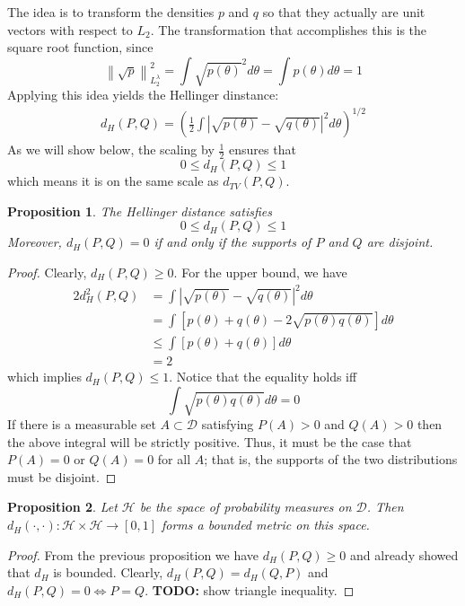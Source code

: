 \documentclass[12pt]{article}
\newcommand*{\norm}[1]{\left\lVert#1\right\rVert}
\newcommand*{\abs}[1]{\left\lvert#1\right\rvert}
\newtheorem{prop}{Proposition}
\begin{document}
The idea is to transform the densities $p$ and $q$ so that they actually are unit vectors with respect to $L_2$. The transformation that accomplishes this is the square root function, since 
\[\norm{\sqrt{p}}^2_{L_2^\lambda} = \int \sqrt{p(\theta)}^2 d\theta =  \int p(\theta) d\theta = 1 \]
Applying this idea yields the Hellinger dinstance:
\begin{align}
d_H(P, Q) = \left(\frac{1}{2} \int \abs{\sqrt{p(\theta)} - \sqrt{q(\theta)}}^2 d\theta \right)^{1/2} 
\end{align} 
As we will show below, the scaling by $\frac{1}{2}$ ensures that 
\[0 \leq d_H(P, Q) \leq 1\]
which means it is on the same scale as $d_{TV}(P, Q)$. 

\begin{prop}
The Hellinger distance satisfies 
\[0 \leq d_H(P, Q) \leq 1\]
Moreover,  $d_H(P, Q) = 0$ if and only if the supports of $P$ and $Q$ are disjoint.  
\end{prop}

\begin{proof}
Clearly, $d_H(P, Q) \geq 0$. For the upper bound, we have 
\begin{align*}
2d^2_H(P, Q) &= \int \abs{\sqrt{p(\theta)} - \sqrt{q(\theta)}}^2 d\theta \\
		      &= \int \left[ p(\theta) + q(\theta) - 2\sqrt{p(\theta) q(\theta)} \right] d\theta \\
		      &\leq \int \left[ p(\theta) + q(\theta) \right] d\theta \\
		      &= 2
\end{align*} 
which implies $d_H(P, Q) \leq 1$. Notice that the equality holds iff
\[\int \sqrt{p(\theta) q(\theta)} d\theta = 0\]
If there is a measurable set $A \subset \mathcal{D}$ satisfying $P(A) > 0$ and $Q(A) > 0$ then the above integral will be strictly positive. 
Thus, it must be the case that $P(A) = 0$ or $Q(A) = 0$ for all $A$; that is, the supports of the two distributions must be disjoint. 
\end{proof}

\begin{prop} 
Let $\mathcal{H}$ be the space of probability measures on $\mathcal{D}$. Then $d_H(\cdot, \cdot): \mathcal{H} \times \mathcal{H} \to [0, 1]$ forms a bounded metric on this space. 
\end{prop}

\begin{proof}
From the previous proposition we have $d_H(P, Q) \geq 0$ and already showed that $d_H$ is bounded. Clearly, $d_H(P, Q) = d_H(Q, P)$ and 
$d_H(P, Q) = 0 \iff P = Q$. \textbf{TODO: } show triangle inequality. 
\end{proof}
\end{document}
